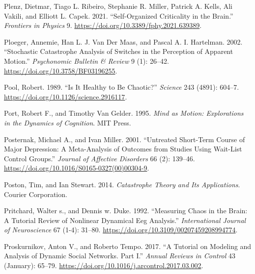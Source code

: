 \documentclass[
  a4paper,
  DIV=11,
  numbers=noendperiod,
  oneside]{scrreprt}
\newlength{\cslhangindent}
\newlength{\cslentryspacingunit} %
\newenvironment{CSLReferences}[2] %
 {%
  \setlength{\parindent}{0pt}
  \ifodd #1
  \let\oldpar\par
  \def\par{\hangindent=\cslhangindent\oldpar}
  \fi
  \setlength{\parskip}{#2\cslentryspacingunit}
 }%
 {}
\begin{document}
\begin{CSLReferences}{1}{0}
\leavevmode{}%
Plenz, Dietmar, Tiago L. Ribeiro, Stephanie R. Miller, Patrick A. Kells,
Ali Vakili, and Elliott L. Capek. 2021. {``Self-{Organized Criticality}
in the {Brain}.''} \emph{Frontiers in Physics} 9.
\url{https://doi.org/10.3389/fphy.2021.639389}.

\leavevmode{}%
Ploeger, Annemie, Han L. J. Van Der Maas, and Pascal A. I. Hartelman.
2002. {``Stochastic Catastrophe Analysis of Switches in the Perception
of Apparent Motion.''} \emph{Psychonomic Bulletin \& Review} 9 (1):
26--42. \url{https://doi.org/10.3758/BF03196255}.

\leavevmode{}%
Pool, Robert. 1989. {``Is {It Healthy} to {Be Chaotic}?''}
\emph{Science} 243 (4891): 604--7.
\url{https://doi.org/10.1126/science.2916117}.

\leavevmode{}%
Port, Robert F., and Timothy Van Gelder. 1995. \emph{Mind as {Motion}:
{Explorations} in the {Dynamics} of {Cognition}}. {MIT Press}.

\leavevmode{}%
Posternak, Michael A., and Ivan Miller. 2001. {``Untreated Short-Term
Course of Major Depression: A Meta-Analysis of Outcomes from Studies
Using Wait-List Control Groups.''} \emph{Journal of Affective Disorders}
66 (2): 139--46. \url{https://doi.org/10.1016/S0165-0327(00)00304-9}.

\leavevmode{}%
Poston, Tim, and Ian Stewart. 2014. \emph{Catastrophe {Theory} and {Its
Applications}}. {Courier Corporation}.

\leavevmode{}%
Pritchard, Walter s., and Dennis w. Duke. 1992. {``Measuring {Chaos} in
the {Brain}: {A Tutorial Review} of {Nonlinear Dynamical Eeg
Analysis}.''} \emph{International Journal of Neuroscience} 67 (1-4):
31--80. \url{https://doi.org/10.3109/00207459208994774}.

\leavevmode{}%
Proskurnikov, Anton V., and Roberto Tempo. 2017. {``A Tutorial on
Modeling and Analysis of Dynamic Social Networks. {Part I}.''}
\emph{Annual Reviews in Control} 43 (January): 65--79.
\url{https://doi.org/10.1016/j.arcontrol.2017.03.002}.


\end{CSLReferences}
\end{document}
